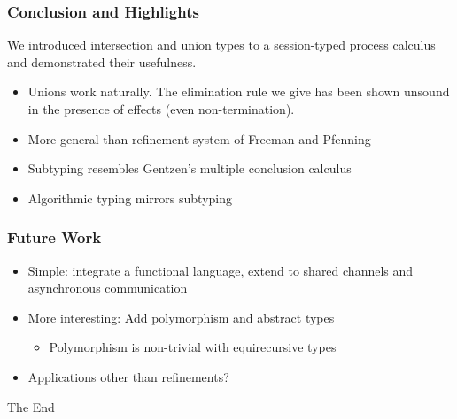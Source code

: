 \documentclass{beamer}
\begin{document}

\begin{frame}
  \frametitle{Conclusion and Highlights}
  We introduced intersection and union types to a session-typed process calculus and demonstrated their usefulness.

  \bigskip
  \begin{itemize}
    \item Unions work naturally. The elimination rule we give has been shown unsound in the presence of effects (even non-termination).
    \pause
    \item More general than refinement system of Freeman and Pfenning
    \pause
    \item Subtyping resembles Gentzen's multiple conclusion calculus
    \pause
    \item Algorithmic typing mirrors subtyping
  \end{itemize}
\end{frame}


\begin{frame}
  \frametitle{Future Work}
  \begin{itemize}
    \item Simple: integrate a functional language, extend to shared channels and asynchronous communication
    \pause
    \item More interesting: Add polymorphism and abstract types
    \begin{itemize}
      \item Polymorphism is non-trivial with equirecursive types
    \end{itemize}
    \pause
    \item Applications other than refinements?
  \end{itemize}
\end{frame}


\begin{frame}
\Huge{\centerline{The End}}
\end{frame}

\end{document}
